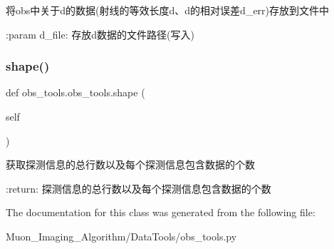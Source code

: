 \begin{DoxyVerb}将obs中关于d的数据(射线的等效长度d、d的相对误差d_err)存放到文件中

:param d_file: 存放d数据的文件路径(写入)
\end{DoxyVerb}
 \mbox{\label{classobs__tools_1_1obs__tools_a1b3754e7b5ac69f56cadbc1684b434fd}} 
\subsubsection{\texorpdfstring{shape()}{shape()}}
{\footnotesize\ttfamily def obs\+\_\+tools.\+obs\+\_\+tools.\+shape (\begin{DoxyParamCaption}\item[{}]{self }\end{DoxyParamCaption})}

\begin{DoxyVerb}获取探测信息的总行数以及每个探测信息包含数据的个数

:return: 探测信息的总行数以及每个探测信息包含数据的个数
\end{DoxyVerb}
 

The documentation for this class was generated from the following file\+:\begin{DoxyCompactItemize}
\item 
Muon\+\_\+\+Imaging\+\_\+\+Algorithm/\+Data\+Tools/obs\+\_\+tools.\+py\end{DoxyCompactItemize}
